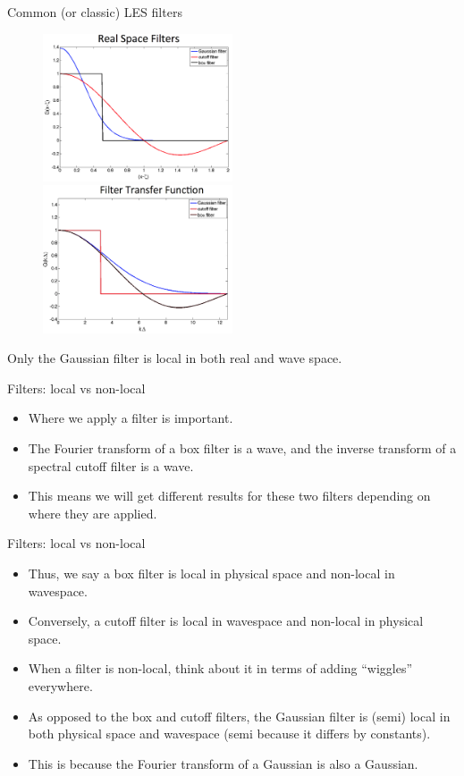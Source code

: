 \begin{frame}{Common (or classic) LES filters}
\begin{figure}
	\includegraphics[width=0.5\textwidth]{filter1.png}
	\includegraphics[width=0.5\textwidth]{filter2.png}
\end{figure}
Only the Gaussian filter is local in both real and wave space.
\end{frame}

\begin{frame}{Filters: local vs non-local}
\begin{itemize}
	\item Where we apply a filter is important.
	\item The Fourier transform of a box filter is a wave, and the inverse transform of a spectral cutoff filter is a wave.
	\item This means we will get different results for these two filters depending on where they are applied.
\end{itemize}
\end{frame}

\begin{frame}{Filters: local vs non-local}
\begin{itemize}
	\item Thus, we say a box filter is local in physical space and non-local in wavespace.
	\item Conversely, a cutoff filter is local in wavespace and non-local in physical space.
	\item When a filter is non-local, think about it in terms of adding ``wiggles'' everywhere.
	\item As opposed to the box and cutoff filters, the Gaussian filter is (semi) local in both physical space and wavespace (semi because it differs by constants).
	\item This is because the Fourier transform of a Gaussian is also a Gaussian.
\end{itemize}
\end{frame}

